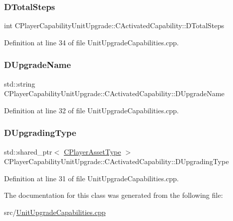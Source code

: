 \subsubsection{\texorpdfstring{D\+Total\+Steps}{DTotalSteps}}
{\footnotesize\ttfamily int C\+Player\+Capability\+Unit\+Upgrade\+::\+C\+Activated\+Capability\+::\+D\+Total\+Steps\hspace{0.3cm}{\ttfamily [protected]}}



Definition at line 34 of file Unit\+Upgrade\+Capabilities.\+cpp.

\hypertarget{classCPlayerCapabilityUnitUpgrade_1_1CActivatedCapability_acb0261591d692393b3c864d75edc799f}{}\label{classCPlayerCapabilityUnitUpgrade_1_1CActivatedCapability_acb0261591d692393b3c864d75edc799f} 
\subsubsection{\texorpdfstring{D\+Upgrade\+Name}{DUpgradeName}}
{\footnotesize\ttfamily std\+::string C\+Player\+Capability\+Unit\+Upgrade\+::\+C\+Activated\+Capability\+::\+D\+Upgrade\+Name\hspace{0.3cm}{\ttfamily [protected]}}



Definition at line 32 of file Unit\+Upgrade\+Capabilities.\+cpp.

\hypertarget{classCPlayerCapabilityUnitUpgrade_1_1CActivatedCapability_a028e222f2adc8a1035090487c93b358b}{}\label{classCPlayerCapabilityUnitUpgrade_1_1CActivatedCapability_a028e222f2adc8a1035090487c93b358b} 
\subsubsection{\texorpdfstring{D\+Upgrading\+Type}{DUpgradingType}}
{\footnotesize\ttfamily std\+::shared\+\_\+ptr$<$ \hyperlink{classCPlayerAssetType}{C\+Player\+Asset\+Type} $>$ C\+Player\+Capability\+Unit\+Upgrade\+::\+C\+Activated\+Capability\+::\+D\+Upgrading\+Type\hspace{0.3cm}{\ttfamily [protected]}}



Definition at line 31 of file Unit\+Upgrade\+Capabilities.\+cpp.



The documentation for this class was generated from the following file\+:\begin{DoxyCompactItemize}
\item 
src/\hyperlink{UnitUpgradeCapabilities_8cpp}{Unit\+Upgrade\+Capabilities.\+cpp}\end{DoxyCompactItemize}

